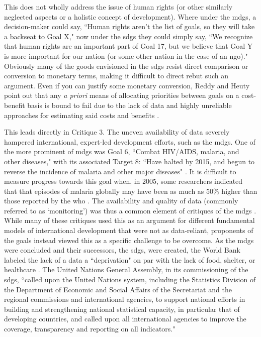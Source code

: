 This does not wholly address the issue of human rights (or other similarly neglected aspects or a holistic concept of development). Where under the \acp{mdg}, a decision-maker could say, ``Human rights aren't the list of goals, so they will take a backseat to Goal X," now under the \acp{sdg} they could simply say, ``We recognize that human rights are an important part of Goal 17, but we believe that Goal Y is more important for our nation (or some other nation in the case of an \ac{ngo})." Obviously many of the goods envisioned in the \acp{sdg} resist direct comparison or conversion to monetary terms, making it difficult to direct rebut such an argument. Even if you can justify some monetary conversion, Reddy and Heuty point out that any \textit{a priori} means of allocating priorities between goals on a cost-benefit basis is bound to fail due to the lack of data and highly unreliable approaches for estimating said costs and benefits \cite{reddyGlobalDevelopmentGoals2008}.

This leads directly in Critique 3. The uneven availability of data severely hampered international, expert-led development efforts, such as the \acp{mdg}. One of the more prominent of \acp{mdg} was Goal 6, ``Combat HIV/AIDS, malaria, and other diseases," with its associated Target 8: ``Have halted by 2015, and begun to reverse the incidence of malaria and other major diseases" \cite{inter-agencyandexpertgrouponmdgindicatorsMillenniumDevelopmentGoals2015}. It is difficult to measure progress towards this goal when, in 2005, some researchers indicated that that episodes of malaria globally may have been as much as 50\% higher than those reported by the \ac{who} \cite{snowGlobalDistributionClinical2005}. The availability and quality of data (commonly referred to as `monitoring') was thus a common element of critiques of the \acp{mdg} \cite{alstonShipsPassingNight2005,fukuda-parrPowerNumbersCritical2014,reddyGlobalDevelopmentGoals2008}. While many of these critiques used this as an argument for different fundamental models of international development that were not as data-reliant, proponents of the goals instead viewed this as a specific challenge to be overcome. As the \acp{mdg} were concluded and their successors, the \acp{sdg}, were created, the World Bank labeled the lack of a data a ``deprivation" on par with the lack of food, shelter, or healthcare \cite{DataDeprivationAnother}. The United Nations General Assembly, in its commissioning of the \acp{sdg}, ``called upon the United Nations system, including the Statistics Division of the Department of Economic and Social Affairs of the Secretariat and the regional commissions and international agencies, to support national efforts in building and strengthening national statistical capacity, in particular that of developing countries, and called upon all international agencies to improve the coverage, transparency and reporting on all indicators."


